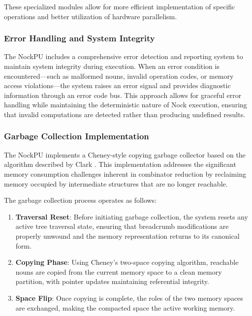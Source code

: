\documentclass[twoside]{article}
\begin{document}
\noindent
These specialized modules allow for more efficient implementation of specific operations and better utilization of hardware parallelism.

\subsubsection{Error Handling and System Integrity}

The NockPU includes a comprehensive error detection and reporting system to maintain system integrity during execution. When an error condition is encountered—such as malformed nouns, invalid operation codes, or memory access violations—the system raises an error signal and provides diagnostic information through an error code bus. This approach allows for graceful error handling while maintaining the deterministic nature of Nock execution, ensuring that invalid computations are detected rather than producing undefined results.

\subsubsection{Garbage Collection Implementation}

The NockPU implements a Cheney-style copying garbage collector based on the algorithm described by Clark \citep{Clark1976}. This implementation addresses the significant memory consumption challenges inherent in combinator reduction by reclaiming memory occupied by intermediate structures that are no longer reachable.

The garbage collection process operates as follows:

\begin{enumerate}
  \item \textbf{Traversal Reset}: Before initiating garbage collection, the system resets any active tree traversal state, ensuring that breadcrumb modifications are properly unwound and the memory representation returns to its canonical form.
  \item \textbf{Copying Phase}: Using Cheney's two-space copying algorithm, reachable nouns are copied from the current memory space to a clean memory partition, with pointer updates maintaining referential integrity.
  \item \textbf{Space Flip}: Once copying is complete, the roles of the two memory spaces are exchanged, making the compacted space the active working memory.
\end{enumerate}
\end{document}
